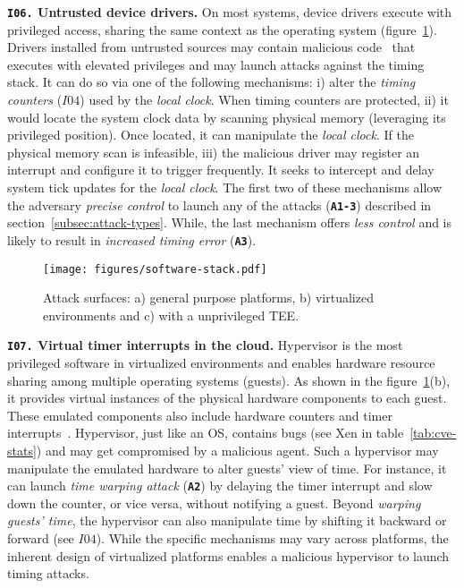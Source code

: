 \noindent\textbf{\texttt{I06.} Untrusted device drivers.} On most systems, device drivers execute with privileged access, sharing the same context as the operating system (figure~\ref{fig:software-stime-stacks}). Drivers installed from untrusted sources may contain malicious code~\cite{sok-attacks-on-software-supply-chains} that executes with elevated privileges and may launch attacks against the timing stack. It can do so via one of the following mechanisms: i) alter the \textit{timing counters} ($I04$) used by the \textit{local clock}. When timing counters are protected, ii) it would locate the system clock data by scanning physical memory (leveraging its privileged position). Once located, it can manipulate the \textit{local clock}. If the physical memory scan is infeasible, iii) the malicious driver may register an interrupt and configure it to trigger frequently. It seeks to intercept and delay system tick updates for the \textit{local clock}. The first two of these mechanisms allow the adversary \textit{precise control} to launch any of the attacks (\textbf{\texttt{A1-3}}) described in section~\ref{subsec:attack-types}. While, the last mechanism offers \textit{less control} and is likely to result in \textit{increased timing error} (\textbf{\texttt{A3}}).

\begin{figure}[h]
    \centering
    \texttt{[image: figures/software-stack.pdf]}
    \caption{Attack surfaces: a) general purpose platforms, b) virtualized environments and c) with a unprivileged TEE.}
    \label{fig:software-stime-stacks}
\end{figure}

\noindent\textbf{\texttt{I07.} Virtual timer interrupts in the cloud.} Hypervisor is the most privileged software in virtualized environments and enables hardware resource sharing among multiple operating systems (guests). As shown in the figure~\ref{fig:software-stime-stacks}(b), it provides virtual instances of the physical hardware components to each guest. These emulated components also include hardware counters and timer interrupts~\cite{time-stack-hyp-paratick}. Hypervisor, just like an OS, contains bugs (see Xen in table~\ref{tab:cve-stats}) and may get compromised by a malicious agent. Such a hypervisor may manipulate the emulated hardware to alter guests' view of time. For instance, it can launch \textit{time warping attack} (\textbf{\texttt{A2}}) by delaying the timer interrupt and slow down the counter, or vice versa, without notifying a guest. Beyond \textit{warping guests' time}, the hypervisor can also manipulate time by shifting it backward or forward (see $I04$). While the specific mechanisms may vary across platforms, the inherent design of virtualized platforms enables a malicious hypervisor to launch timing attacks.

